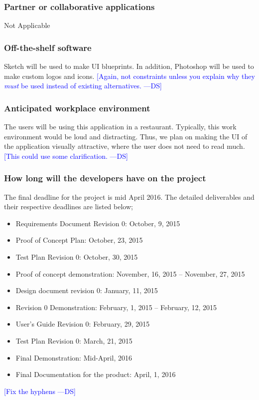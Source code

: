 \documentclass[12pt, titlepage]{article}
\newcommand{\authornote}[3]{\textcolor{#1}{[#3 ---#2]}}
\newcommand{\authornote}[3]{}
\newcommand{\ds}[1]{\authornote{blue}{DS}{#1}}
\begin{document}
\subsubsection{Partner or collaborative applications}
Not Applicable \newline\newline

\subsubsection{Off-the-shelf software}

Sketch will be used to make UI blueprints. In addition, Photoshop will be used to make custom logos and icons. 
\ds{Again, not constraints unless you explain why they \emph{must} be used 
instead of existing alternatives.}
\newline\newline

\subsubsection{Anticipated workplace environment}
The users will be using this application in a restaurant. Typically, this work environment would be loud and distracting. Thus, we plan on making the UI of the application visually attractive, where the user does not need to read much.
\ds{This could use some clarification.}
\newline\newline

\subsubsection{How long will the developers have on the project}
The final deadline for the project is mid April 2016. The detailed deliverables and their respective deadlines are listed below;
\begin{itemize}
  \item Requirements Document Revision 0: October, 9, 2015 
  \item Proof of Concept Plan: October, 23, 2015
  \item 	Test Plan Revision 0: October, 30, 2015
  \item 	Proof of concept demonstration: November, 16, 2015  – November, 27, 2015
  \item Design document revision 0: January, 11, 2015
  \item Revision 0 Demonstration: February, 1, 2015  – February, 12, 2015
  \item User’s Guide Revision 0: February, 29, 2015
  \item 	Test Plan Revision 0: March, 21, 2015
  \item Final Demonstration: Mid-April, 2016
  \item 	Final Documentation for the product: April, 1, 2016
\end{itemize}
\ds{Fix the hyphens}
\end{document}
